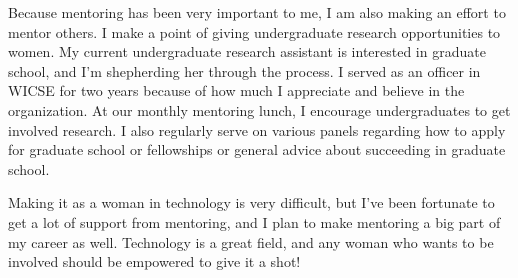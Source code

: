 \documentclass{article}
\begin{document}
Because mentoring has been very important to me, I am also making an effort to mentor others.
I make a point of giving undergraduate research opportunities to women.
My current undergraduate research assistant is interested in graduate school, and I'm shepherding her through the process.
I served as an officer in WICSE for two years because of how much I appreciate and believe in the organization.
At our monthly mentoring lunch, I encourage undergraduates to get involved research.
I also regularly serve on various panels regarding how to apply for graduate school or fellowships or general advice about succeeding in graduate school.

Making it as a woman in technology is very difficult, but I've been fortunate to get a lot of support from mentoring, and I plan to make mentoring a big part of my career as well.
Technology is a great field, and any woman who wants to be involved should be empowered to give it a shot!
\end{document}
